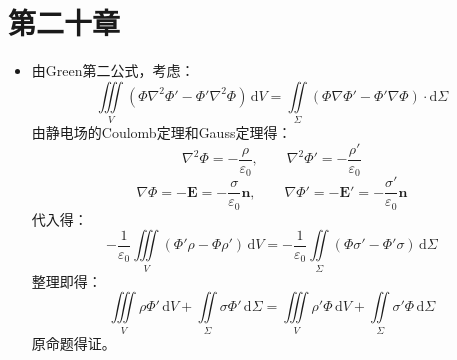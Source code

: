 \documentclass[a4paper,fontset=windows]{ctexart}
\begin{document}
\newpage
\section*{第二十章}
\bigskip

\begin{itemize}

\item[1.]
由Green第二公式，考虑：
\[
\iiint\limits_V(\varPhi\nabla^2\varPhi' - \varPhi'\nabla^2\varPhi)\,\mathrm{d}V = \iint\limits_\varSigma(\varPhi\nabla\varPhi' - \varPhi'\nabla\varPhi)\cdot\mathrm{d}\bm{\varSigma}
\]
由静电场的Coulomb定理和Gauss定理得：
\[
\nabla^2\varPhi = -\frac{\rho}{\varepsilon_0},\qquad \nabla^2\varPhi' = -\frac{\rho'}{\varepsilon_0}
\]
\[
\nabla\varPhi = -\bm{E} = -\frac{\sigma}{\varepsilon_0}\bm{n},\qquad \nabla\varPhi' = -\bm{E'} = -\frac{\sigma'}{\varepsilon_0}\bm{n}
\]
代入得：
\[
-\frac{1}{\varepsilon_0}\iiint\limits_V(\varPhi'\rho-\varPhi\rho')\,\mathrm{d}V = -\frac{1}{\varepsilon_0}\iint\limits_\varSigma(\varPhi\sigma'-\varPhi'\sigma)\,\mathrm{d}\varSigma
\]
整理即得：
\[
\iiint\limits_V\rho\varPhi'\,\mathrm{d}V + \iint\limits_\varSigma\sigma\varPhi'\,\mathrm{d}\varSigma = \iiint\limits_V\rho'\varPhi\,\mathrm{d}V + \iint\limits_\varSigma\sigma'\varPhi\,\mathrm{d}\varSigma
\]
原命题得证。

\end{itemize}
\end{document}
